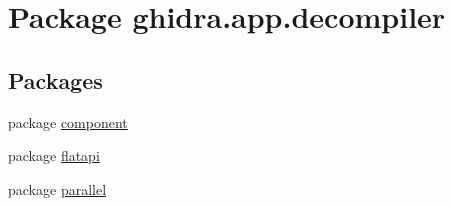 \hypertarget{namespaceghidra_1_1app_1_1decompiler}{}\section{Package ghidra.\+app.\+decompiler}
\label{namespaceghidra_1_1app_1_1decompiler}
\subsection*{Packages}
\begin{DoxyCompactItemize}
\item 
package \mbox{\hyperlink{namespaceghidra_1_1app_1_1decompiler_1_1component}{component}}
\item 
package \mbox{\hyperlink{namespaceghidra_1_1app_1_1decompiler_1_1flatapi}{flatapi}}
\item 
package \mbox{\hyperlink{namespaceghidra_1_1app_1_1decompiler_1_1parallel}{parallel}}
\end{DoxyCompactItemize}

